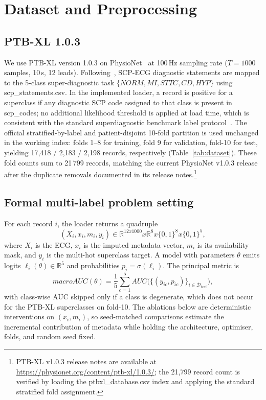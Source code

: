 \documentclass[mathematics,article,pdftex]{Definitions/mdpi}
\def\texttt#1{#1}%
\def\mathrm#1{#1}%
\def\mathbf#1{#1}%
\def\bm#1{#1}%
\def\times{x}%
\begin{document}
\section{Dataset and Preprocessing}\label{sec:dataset}

\subsection{PTB-XL 1.0.3}
We use PTB-XL version 1.0.3 on PhysioNet~\cite{Wagner2020,Goldberger2000} at 100\,Hz sampling rate ($T{=}1000$ samples, 10\,s, 12 leads). Following~\cite{Strodthoff2021}, SCP-ECG diagnostic statements are mapped to the 5-class super-diagnostic task $\{\mathrm{NORM}, \mathrm{MI}, \mathrm{STTC}, \mathrm{CD}, \mathrm{HYP}\}$ using \texttt{scp\_statements.csv}. In the implemented loader, a record is positive for a superclass if any diagnostic SCP code assigned to that class is present in \texttt{scp\_codes}; no additional likelihood threshold is applied at load time, which is consistent with the standard superdiagnostic benchmark label protocol~\cite{Strodthoff2021}. The official stratified-by-label and patient-disjoint 10-fold partition is used unchanged in the working index: folds 1--8 for training, fold 9 for validation, fold-10 for test, yielding 17{,}418 / 2{,}183 / 2{,}198 records, respectively (Table~\ref{tab:dataset}). These fold counts sum to 21\,799 records, matching the current PhysioNet v1.0.3 release after the duplicate removals documented in its release notes.\footnote{PTB-XL v1.0.3 release notes are available at \url{https://physionet.org/content/ptb-xl/1.0.3/}; the 21{,}799 record count is verified by loading the \texttt{ptbxl\_database.csv} index and applying the standard stratified fold assignment.}

\subsection{Formal multi-label problem setting}
For each record $i$, the loader returns a quadruple
\[
(\mathbf{X}_i,\mathbf{x}_i,\mathbf{m}_i,\mathbf{y}_i)
\in \mathbb{R}^{12\times1000}\times\mathbb{R}^{8}\times\{0,1\}^{8}\times\{0,1\}^{5},
\]
where $\mathbf{X}_i$ is the ECG, $\mathbf{x}_i$ is the imputed metadata vector, $\mathbf{m}_i$ is its availability mask, and $\mathbf{y}_i$ is the multi-hot superclass target. A model with parameters $\theta$ emits logits $\bm{\ell}_{i}(\theta)\in\mathbb{R}^{5}$ and probabilities $\mathbf{p}_{i}=\sigma(\bm{\ell}_{i})$. The principal metric is
\[
\mathrm{macroAUC}(\theta)=\frac{1}{5}\sum_{c=1}^{5}\mathrm{AUC}\bigl(\{(y_{ic},p_{ic})\}_{i\in\mathcal{D}_{\mathrm{test}}}\bigr),
\]
with class-wise AUC skipped only if a class is degenerate, which does not occur for the PTB-XL superclasses on fold-10. The ablations below are deterministic interventions on $(\mathbf{x}_i,\mathbf{m}_i)$, so seed-matched comparisons estimate the incremental contribution of metadata while holding the architecture, optimiser, folds, and random seed fixed.
\end{document}

